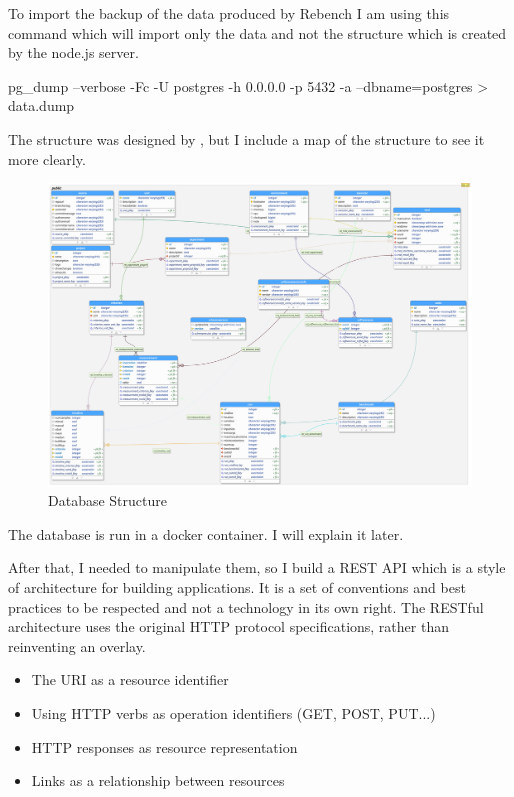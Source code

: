 \documentclass{article}
\begin{document}
To import the backup of the data produced by Rebench I am using this command which will import only the data and not the structure which is created by the node.js server.

\begin{python}[h!]
pg_dump --verbose -Fc -U postgres -h 0.0.0.0 -p 5432  -a --dbname=postgres > data.dump
\end{python}

The structure was designed by \citep{ReBench:2018}, but I include a map of the structure to see it more clearly.


\begin{figure}[h!]
    \centering
    \includegraphics[width=1\textwidth]{images/database.png}
    \caption{Database Structure}
    \label{fig:database}
\end{figure}

The database is run in a docker container. I will explain it later.

After that, I needed to manipulate them, so I build a REST API which is a style of architecture for building applications. It is a set of conventions and best practices to be respected and not a technology in its own right. The RESTful architecture uses the original HTTP protocol specifications, rather than reinventing an overlay.

\begin{itemize}
    \item The URI as a resource identifier
    \item Using HTTP verbs as operation identifiers (GET, POST, PUT...)
    \item HTTP responses as resource representation
    \item Links as a relationship between resources
\end{itemize}
\end{document}
